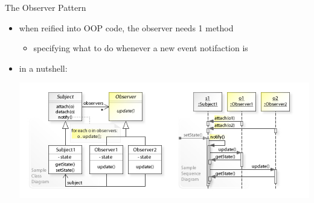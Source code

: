 \documentclass[presentation]{beamer}
\begin{document}
\begin{frame}[allowframebreaks]{The Observer Pattern}
\begin{itemize}
    \item when reified into OOP code, the observer needs 1 method
    \begin{itemize}
      \item specifying what to do whenever a new event notifaction is 
    \end{itemize}

    \item in a nutshell:
    \begin{center}
      \includegraphics[width=.8\linewidth]{img/observer-pattern.jpg}
    \end{center}

  \end{itemize}
\end{frame}
\end{document}
